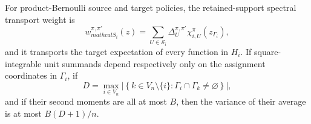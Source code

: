 For product-Bernoulli source and target policies, the retained-support spectral transport weight is
\[
 w_{mathcal S_i}^{\pi,\pi'}(z)
 =\sum_{U\in\mathcal S_i}\Delta_U^{\pi,\pi'}
   \chi_{i,U}^{\pi}(z_{\Gamma_i}),
\]
and it transports the target expectation of every function in \(H_i\).  If square-integrable unit summands depend respectively only on the assignment coordinates in \(\Gamma_i\), if
\[
 D=\max_{i\in V_n}
 \left|\left\{k\in V_n\setminus\{i\}:\Gamma_i\cap\Gamma_k\ne\varnothing\right\}\right|,
\]
and if their second moments are all at most \(B\), then the variance of their average is at most \(B(D+1)/n\).